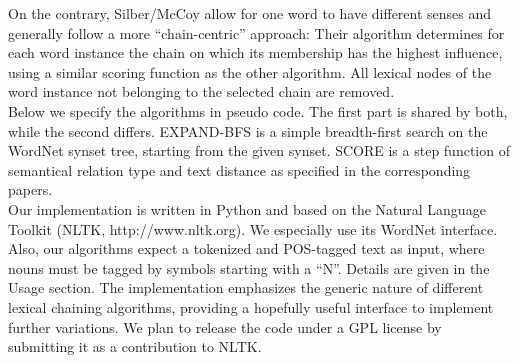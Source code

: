 \documentclass[11pt, a4paper, abstraction]{scrartcl}
\begin{document}
On the contrary, Silber/McCoy allow for one word to have different senses and generally follow a more ``chain-centric'' approach: Their algorithm determines for each word instance the chain on which its membership has the highest influence, using a similar scoring function as the other algorithm. All lexical nodes of the word instance not belonging to the selected chain are removed. \\
Below we specify the algorithms in pseudo code. The first part is shared by both, while the second differs. EXPAND-BFS is a simple breadth-first search on the WordNet synset tree, starting from the given synset. SCORE is a step function of semantical relation type and text distance as specified in the corresponding papers. \\

Our implementation is written in Python and based on the Natural Language Toolkit (NLTK, http://www.nltk.org). We especially use its WordNet interface. Also, our algorithms expect a tokenized and POS-tagged text as input, where nouns must be tagged by symbols starting with a ``N''.  Details are given in the Usage section. The implementation emphasizes the generic nature of different lexical chaining algorithms, providing a hopefully useful interface to implement further variations. We plan to release the code under a GPL license by submitting it as a contribution to NLTK.
\end{document}
